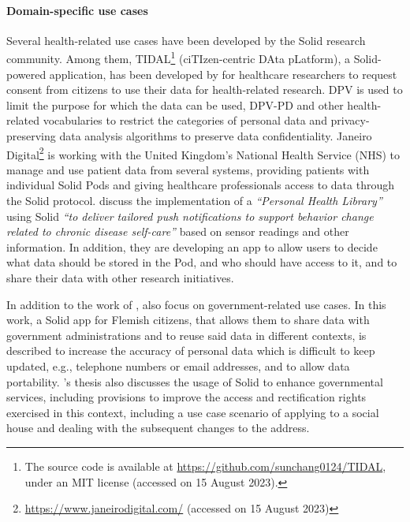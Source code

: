 \paragraph{Domain-specific use cases}
Several health-related use cases have been developed by the Solid research community.
Among them, TIDAL\footnote{The source code is available at \url{https://github.com/sunchang0124/TIDAL}, under an MIT license (accessed on 15 August 2023).} (ciTIzen-centric DAta pLatform), a Solid-powered application, has been developed by \cite{sun_citizen-centric_2023} for healthcare researchers to request consent from citizens to use their data for health-related research. DPV is used to limit the purpose for which the data can be used, DPV-PD and other health-related vocabularies to restrict the categories of personal data and privacy-preserving data analysis algorithms to preserve data confidentiality.
Janeiro Digital\footnote{\url{https://www.janeirodigital.com/} (accessed on 15 August 2023)} \citeyearpar{noauthor_janeiro_nodate} is working with the United Kingdom's National Health Service (NHS) to manage and use patient data from several systems, providing patients with individual Solid Pods and giving healthcare professionals access to data through the Solid protocol.
\cite{ammar_personal_2020,ammar_using_2021} discuss the implementation of a \textit{``Personal Health Library''} using Solid \textit{``to deliver tailored push notifications to support behavior change related to chronic disease self-care''} based on sensor readings and other information.
In addition, they are developing an app to allow users to decide what data should be stored in the Pod, and who should have access to it, and to share their data with other research initiatives.

In addition to the work of \cite{de_bot_data_2021}, \cite{chugunov_streamlining_2020} also focus on government-related use cases. In this work, a Solid app for Flemish citizens, that allows them to share data with government administrations and to reuse said data in different contexts, is described to increase the accuracy of personal data which is difficult to keep updated, e.g., telephone numbers or email addresses, and to allow data portability.
\citeauthor{wang_enhancing_2020}'s thesis also discusses the usage of Solid to enhance governmental services, including provisions to improve the access and rectification rights exercised in this context, including a use case scenario of applying to a social house and dealing with the subsequent changes to the address. 

